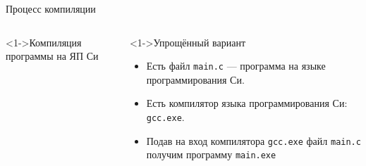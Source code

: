 \documentclass[pdf,9pt,aspectratio=169]{beamer}
\begin{document}
\begin{frame}{Процесс компиляции}
  \begin{columns}[T]
    \begin{column}[]{0.45\textwidth}  
      \begin{exampleblock}<1->{Компиляция программы на ЯП Си}
        \begin{center}
        \end{center}
      \end{exampleblock}
    \end{column}
    \begin{column}[]{0.45\textwidth}  
      \begin{block}<1->{Упрощённый вариант}
        \begin{itemize}
          \item Есть файл \texttt{main.c} --- программа на языке программирования Си.
          \item Есть компилятор языка программирования Си: \texttt{gcc.exe}.
          \item Подав на вход компилятора \texttt{gcc.exe} файл \texttt{main.c} получим программу \texttt{main.exe}
        \end{itemize}
      \end{block}
    \end{column}
  \end{columns}
\end{frame}
\end{document}
